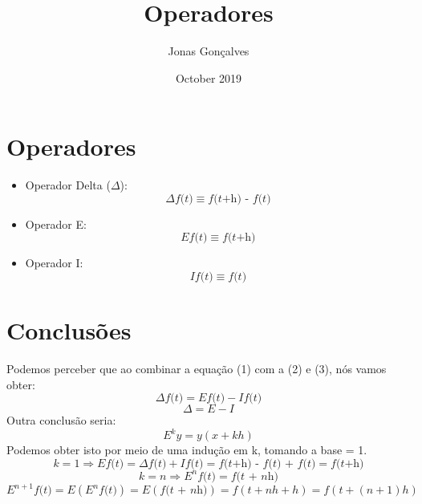 \documentclass{article}
\title{Operadores}
\author{Jonas Gonçalves}
\date{October 2019}
\begin{document}
\maketitle

\section{Operadores}
    \begin{itemize}
        \item Operador Delta (\(\Delta\)):
            \begin{equation}
                \Delta\textit{f(t)} \equiv \textit{f(t+h) - f(t)}
            \end{equation}
    
        \item Operador E:
            \begin{equation}
                E\textit{f(t)} \equiv \textit{f(t+h)}
            \end{equation}
        \item Operador I:
            \begin{equation}
                I\textit{f(t)} \equiv \textit{f(t)}
            \end{equation}
    \end{itemize}

\section{Conclusões}
    Podemos perceber que ao combinar a equação (1) com a (2) e (3), nós vamos obter:
    \begin{equation}
        \Delta\textit{f(t)} = E\textit{f(t)} - I\textit{f(t)}
    \end{equation}
    \begin{equation}
        \Delta = E - I
    \end{equation}
    Outra conclusão seria:
    \begin{equation}
        E^k\textit{y} = y(x+kh)
    \end{equation}
    Podemos obter isto por meio de uma indução em k, tomando a base = 1.
    \[k = 1 \Longrightarrow E\textit{f(t)} = \Delta\textit{f(t)} + I\textit{f(t)} = \textit{f(t+h) - f(t) + f(t)} = \textit{f(t+h)} \]
    \[k = n \Longrightarrow E^n\textit{f(t)} = \textit{f(t + nh)}  \]
    \[E^{n+1}\textit{f(t)} = E(E^n\textit{f(t)}) = E(\textit{f(t + nh)}) = f(t + nh + h) = f(t + (n+1)h)\]
    
\end{document}

